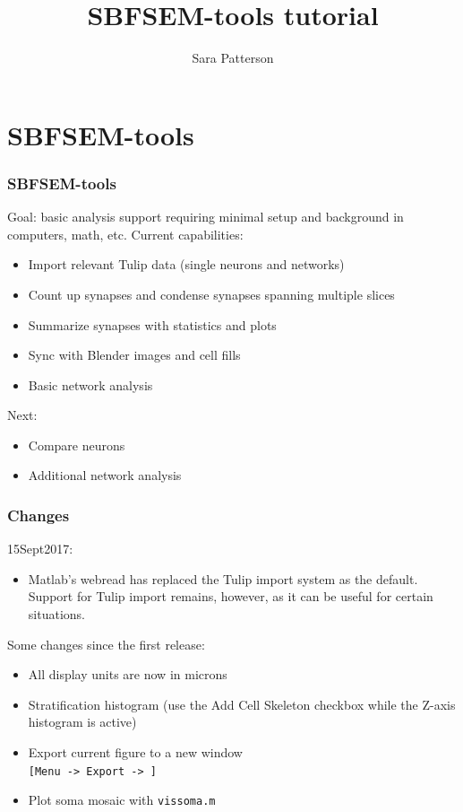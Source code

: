 \documentclass[11pt]{beamer}
\title{SBFSEM-tools tutorial}
\author{Sara Patterson}
\institute{University of Washington}
\begin{document}
	\maketitle
	\begin{frame}
		\tableofcontents
	\end{frame}
	\section{SBFSEM-tools}
\begin{frame}
	\frametitle{SBFSEM-tools}
	Goal: basic analysis support requiring minimal setup and background in computers, math, etc.
	\vskip10pt
	Current capabilities:
	\begin{itemize}
		\item Import relevant Tulip data (single neurons and networks)
		\item Count up synapses and condense synapses spanning multiple slices 
		\item Summarize synapses with statistics and plots
		\item Sync with Blender images and cell fills
		\item Basic network analysis
	\end{itemize}
	Next:\\
	\begin{itemize}
		\item Compare neurons
		\item Additional network analysis
	\end{itemize}
\end{frame}
\begin{frame}
	\frametitle{Changes}
	15Sept2017:
	\begin{itemize}
		\item Matlab's webread has replaced the Tulip import system as the default. Support for Tulip import remains, however, as it can be useful for certain situations.
	\end{itemize}
	Some changes since the first release:
	\begin{itemize}
		\item All display units are now in microns
		\item Stratification histogram (use the Add Cell Skeleton checkbox while the Z-axis histogram is active)
		\item Export current figure to a new window\\ \texttt{[Menu -> Export -> ]}
		\item Plot soma mosaic with \texttt{vissoma.m}
	\end{itemize}
\end{frame}
\end{document}
